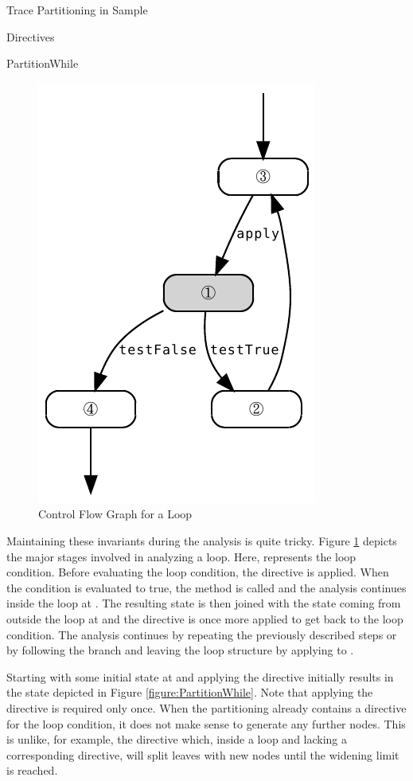 \begin{chapter}{Trace Partitioning in Sample}
\begin{section}{Directives}
\begin{subsection}{PartitionWhile}
			\begin{figure}
				\centering
				\includegraphics{Graphs/PartitionWhileControlFlow.pdf}
				\caption{Control Flow Graph for a Loop}
				\label{figure:PartitionWhileControlFlow}
			\end{figure}

			Maintaining these invariants during the analysis is quite tricky. Figure \ref{figure:PartitionWhileControlFlow} depicts the major stages involved in analyzing a loop. Here, \one represents the loop condition. Before evaluating the loop condition, the  directive is applied. When the condition is evaluated to true, the  method is called and the analysis continues inside the loop at \two. The resulting state is then joined with the state coming from outside the loop at \three and the directive is once more applied to get back to the loop condition. The analysis continues by repeating the previously described steps or by following the  branch and leaving the loop structure by applying  to \four.

			Starting with some initial state at \three and applying the directive initially results in the state depicted in Figure \ref{figure:PartitionWhile}. Note that applying the directive is required only once. When the partitioning already contains a  directive for the loop condition, it does not make sense to generate any further nodes. This is unlike, for example, the  directive which, inside a loop and lacking a corresponding  directive, will split leaves with new nodes until the widening limit is reached.
			

\end{subsection}
\end{section}
\end{chapter}
